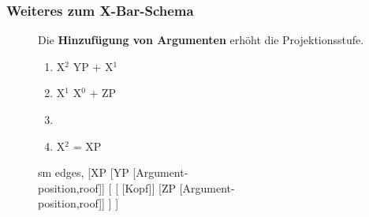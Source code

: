 \begin{frame}
\frametitle{Weiteres zum X-Bar-Schema}

\begin{figure}[b]

  	\begin{minipage}[b]{0.45\textwidth}
	Die \textbf{Hinzufügung von Argumenten} erhöht die Projektionsstufe.
	\begin{enumerate}
		\item X$^2$ \ras YP + X$^1$
		\item X$^1$ \ras X$^0$ + ZP
		\item[]
		\item X$^2$ = XP
	\end{enumerate}
	
  	\end{minipage}  
	\begin{minipage}[b]{0.45\textwidth}
	\centering
	\footnotesize{
		\begin{forest}
		sm edges,
		[\alert{XP} [YP [Argument-\\position,roof]]
			[\alert{}
				[\alert{} [Kopf]]
				[ZP [Argument-\\position,roof]]
			]
		]
		\end{forest}
		}
  	\end{minipage}  
\end{figure}

\end{frame}


